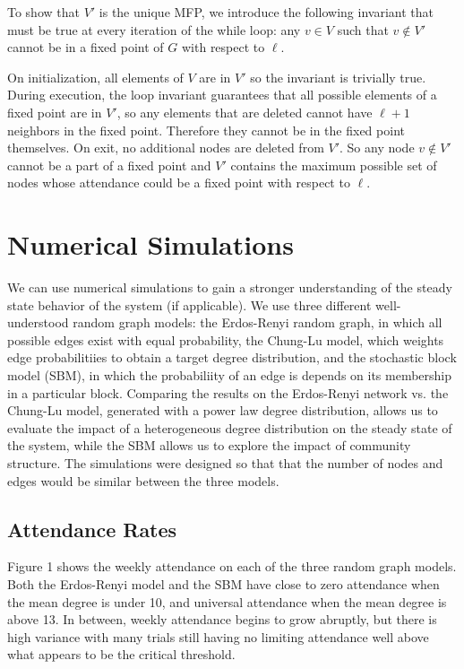 \documentclass[12pt]{article}
\begin{document}
  To show that $V'$ is the unique MFP, we introduce the following invariant that must be true at every iteration of the while loop: any $v \in V$ such that $v \notin V'$ cannot be in a fixed point of $G$ with respect to $\ell$.

  On initialization, all elements of $V$ are in $V'$ so the invariant is trivially true.  During execution, the loop invariant guarantees that all possible elements of a fixed point are in $V'$, so any elements that are deleted cannot have $\ell + 1$ neighbors in the fixed point.  Therefore they cannot be in the fixed point themselves.  On exit, no additional nodes are deleted from $V'$.  So any node $v \notin V'$ cannot be a part of a fixed point and $V'$ contains the maximum possible set of nodes whose attendance could be a fixed point with respect to $\ell$. 

\section{Numerical Simulations}
We can use numerical simulations to gain a stronger understanding of the steady state behavior of the system (if applicable).  We use three different well-understood random graph models: the Erdos-Renyi random graph, in which all possible edges exist with equal probability, the Chung-Lu model, which weights edge probabilitiies to obtain a target degree distribution, and the stochastic block model (SBM), in which the probabiliity of an edge is depends on its membership in a particular block.  Comparing the results on the Erdos-Renyi network vs. the Chung-Lu model, generated with a power law degree distribution, allows us to evaluate the impact of a heterogeneous degree distribution on the steady state of the system, while the SBM allows us to explore the impact of community structure.  The simulations were designed so that that the number of nodes and edges would be similar between the three models.

\subsection{Attendance Rates}
Figure 1 shows the weekly attendance on each of the three random graph models.  Both the Erdos-Renyi model and the SBM have close to zero attendance when the mean degree is under 10, and universal attendance when the mean degree is above 13.  In between, weekly attendance begins to grow abruptly, but there is high variance with many trials still having no limiting attendance well above what appears to be the critical threshold.
\end{document}

